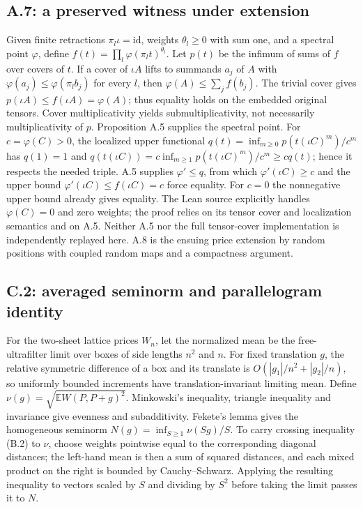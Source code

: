 \documentclass[11pt,letterpaper]{article}
\begin{document}
\subsection{A.7: a preserved witness under extension}
Given finite retractions $\pi_l\iota=\mathrm{id}$, weights $\theta_l\ge0$ with sum one, and a spectral point $\varphi$, define $f(t)=\prod_l\varphi(\pi_l t)^{\theta_l}$. Let $p(t)$ be the infimum of sums of $f$ over covers of $t$. If a cover of $\iota A$ lifts to summands $a_j$ of $A$ with $\varphi(a_j)\le\varphi(\pi_l b_j)$ for every $l$, then $\varphi(A)\le\sum_jf(b_j)$. The trivial cover gives $p(\iota A)\le f(\iota A)=\varphi(A)$; thus equality holds on the embedded original tensors. Cover multiplicativity yields submultiplicativity, not necessarily multiplicativity of $p$. Proposition A.5 supplies the spectral point. For $c=\varphi(C)>0$, the localized upper functional $q(t)=\inf_{m\ge0}p(t(\iota C)^m)/c^m$ has $q(1)=1$ and $q(t(\iota C))=c\inf_{m\ge1}p(t(\iota C)^m)/c^m\ge c q(t)$; hence it respects the needed triple. A.5 supplies $\varphi'\le q$, from which $\varphi'(\iota C)\ge c$ and the upper bound $\varphi'(\iota C)\le f(\iota C)=c$ force equality. For $c=0$ the nonnegative upper bound already gives equality. The Lean source explicitly handles $\varphi(C)=0$ and zero weights; the proof relies on its tensor cover and localization semantics and on A.5. Neither A.5 nor the full tensor-cover implementation is independently replayed here. A.8 is the ensuing price extension by random positions with coupled random maps and a compactness argument.

\subsection{C.2: averaged seminorm and parallelogram identity}
For the two-sheet lattice prices $W_n$, let the normalized mean be the free-ultrafilter limit over boxes of side lengths $n^2$ and $n$. For fixed translation $g$, the relative symmetric difference of a box and its translate is $O(|g_1|/n^2+|g_2|/n)$, so uniformly bounded increments have translation-invariant limiting mean. Define $\nu(g)=\sqrt{\mathbb E W(P,P+g)^2}$. Minkowski's inequality, triangle inequality and invariance give evenness and subadditivity. Fekete's lemma gives the homogeneous seminorm $N(g)=\inf_{S\ge1}\nu(Sg)/S$. To carry crossing inequality (B.2) to $\nu$, choose weights pointwise equal to the corresponding diagonal distances; the left-hand mean is then a sum of squared distances, and each mixed product on the right is bounded by Cauchy--Schwarz. Applying the resulting inequality to vectors scaled by $S$ and dividing by $S^2$ before taking the limit passes it to $N$.
\end{document}

